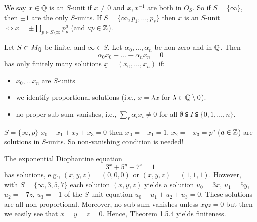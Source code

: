 \documentclass[NumTh.tex]{subfiles}
\begin{document}
We say $x \in \mathbb{Q}$ is an $S$-unit if $x \neq 0$ and $x, x^{-1}$ are both in $O_S$.
So if $S = \{ \infty \}$, then $\pm 1$ are the only $S$-units. If $S = \{ \infty,p_1,\dots,p_s \}$ then $x$ is an $S$-unit $\iff x = \pm \prod_{p \in S \setminus \infty} p^a_p$ (and $ap \in \mathbb{Z}$).

\begin{theorem}
  Let $S \subset M_{\mathbb{Q}}$ be finite, and $\infty \in S$. Let $\alpha_0,\dots,\alpha_n$ be non-zero and in $\mathbb{Q}$.
  Then 
  \[ \alpha_0 x_0 + \dots + \alpha_n x_n = 0 \]
  has only finitely many solutions $\underline{x} = (x_0,\dots,x_n)$ if:
  \begin{itemize}
    \item $x_0,\dots x_n$ are $S$-units
    \item we identify proportional solutions (i.e., $\underline{x} = \lambda \underline{x}$ for $ \lambda \in \mathbb{Q} \setminus 0$).
    \item no proper sub-sum vanishes, i.e., $\sum_{I} \alpha_i x_i \neq 0$ for all $\emptyset \subsetneqq I \subsetneqq \{0,1,\dots,n\}$.
  \end{itemize}
\end{theorem}

\begin{rem}
  $S = \{\infty, p \}$ $x_0+x_1+x_2+x_3 = 0$ then $x_0 = - x_1 =  1$, $x_2 = - x_3 = p^a$ ($a \in \mathbb{Z}$)
  are solutions in $S$-units. So non-vanishing condition is needed!
\end{rem}

\begin{ex}
  The exponential Diophantine equation 
  \[ 3^x + 5^y - 7^z = 1 \]
  has solutions, e.g., $(x,y,z) = (0,0,0)$ or $(x,y,z) = (1,1,1)$.
  However, with $S = \{ \infty,3,5,7 \}$ each solution $(x,y,z)$ yields a solution $u_0 = 3x$, $u_1 = 5y$, $u_2 = - 7z$, $u_3 = - 1$ of the $S$-unit equation $u_0 + u_1 + u_2 + u_3 = 0$.
  These solutions are all non-proportional.
  Moreover, no sub-sum vanishes unless $x y z = 0$ but then we easily see that $x=y=z=0$.
  Hence, Theorem 1.5.4 yields finiteness.
\end{ex}
\end{document}
